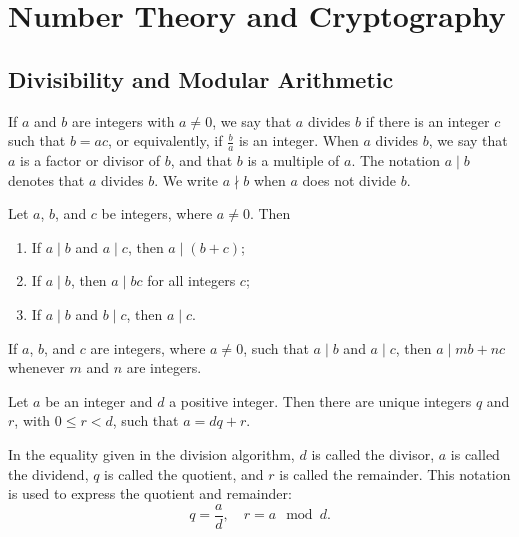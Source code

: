\section{Number Theory and Cryptography}
\subsection{Divisibility and Modular Arithmetic}
\begin{defn}[Divides]
If \(a\) and \(b\) are integers with \(a \neq 0\), we say that \(a\) divides \(b\) if there is an integer \(c\) such that \(b = ac\), or equivalently, if \(\frac{b}{a}\) is an integer. When \(a\) divides \(b\), we say that \(a\) is a factor or divisor of \(b\), and that \(b\) is a multiple of \(a\). The notation \(a \mid b\) denotes that \(a\) divides \(b\). We write \(a \nmid b\) when \(a\) does not divide \(b\).

\end{defn}
\begin{thm}
Let \(a\), \(b\), and \(c\) be integers, where \(a \neq 0\). Then
\begin{enumerate}
    \item[(i)] If \(a \mid b\) and \(a \mid c\), then \(a \mid (b + c)\);
    \item[(ii)] If \(a \mid b\), then \(a \mid bc\) for all integers \(c\);
    \item[(iii)] If \(a \mid b\) and \(b \mid c\), then \(a \mid c\).
\end{enumerate}

\end{thm}
\begin{thm}
If \(a\), \(b\), and \(c\) are integers, where \(a \neq 0\), such that \(a \mid b\) and \(a \mid c\), then \(a \mid mb + nc\) whenever \(m\) and \(n\) are integers.


\end{thm}

\begin{thm}
Let \(a\) be an integer and \(d\) a positive integer. Then there are unique integers \(q\) and \(r\), with \(0 \leq r < d\), such that \(a = dq + r\).

\end{thm}
\begin{defn}
In the equality given in the division algorithm, \(d\) is called the divisor, \(a\) is called the dividend, \(q\) is called the quotient, and \(r\) is called the remainder. This notation is used to express the quotient and remainder:
\[q = \frac{a}{d}, \quad r = a \mod d.\]


\end{defn}

